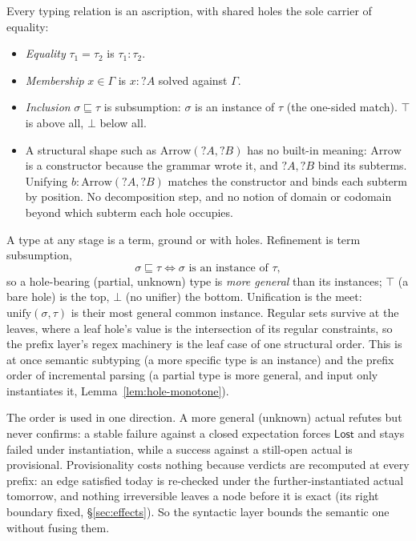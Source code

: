 Every typing relation is an ascription, with shared holes the sole carrier of
equality:
\begin{itemize}[nosep]
  \item \emph{Equality} $\tau_1 = \tau_2$ is $\tau_1 : \tau_2$.
  \item \emph{Membership} $x \in \Gamma$ is $x : ?A$ solved against $\Gamma$.
  \item \emph{Inclusion} $\sigma \sqsubseteq \tau$ is subsumption: $\sigma$ is an
        instance of $\tau$ (the one-sided match). $\top$ is above all, $\bot$
        below all.
  \item A structural shape such as $\mathrm{Arrow}(?A, ?B)$ has no built-in
        meaning: $\mathrm{Arrow}$ is a constructor because the grammar wrote it,
        and $?A, ?B$ bind its subterms. Unifying $b : \mathrm{Arrow}(?A, ?B)$
        matches the constructor and binds each subterm by position. No
        decomposition step, and no notion of domain or codomain beyond which
        subterm each hole occupies.
\end{itemize}

\begin{remark}
  \label{rem:subtype-inclusion}
  A type at any stage is a term, ground or with holes. Refinement is term
  subsumption,
  \[
    \sigma \sqsubseteq \tau \iff \sigma \text{ is an instance of } \tau,
  \]
  so a hole-bearing (partial, unknown) type is \emph{more general} than its
  instances; $\top$ (a bare hole) is the top, $\bot$ (no unifier) the bottom.
  Unification is the meet: $\mathrm{unify}(\sigma, \tau)$ is their most general
  common instance. Regular sets survive at the leaves, where a leaf hole's value
  is the intersection of its regular constraints, so the prefix layer's regex
  machinery is the leaf case of one structural order. This is at once semantic
  subtyping (a more specific type is an instance) and the prefix order of
  incremental parsing (a partial type is more general, and input only
  instantiates it, Lemma~\ref{lem:hole-monotone}).

  The order is used in one direction. A more general (unknown) actual refutes
  but never confirms: a stable failure against a closed expectation forces
  $\mathsf{Lost}$ and stays failed under instantiation, while a success against
  a still-open actual is provisional. Provisionality costs nothing because
  verdicts are recomputed at every prefix: an edge satisfied today is
  re-checked under the further-instantiated actual tomorrow, and nothing
  irreversible leaves a node before it is exact (its right boundary fixed,
  \S\ref{sec:effects}). So the syntactic layer bounds the semantic one without
  fusing them.
\end{remark}

